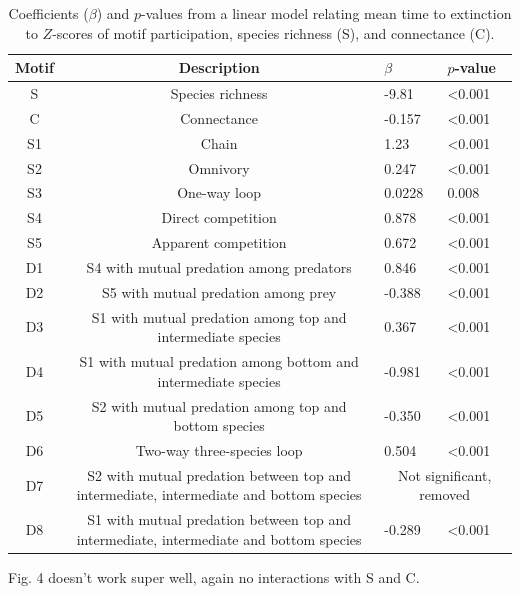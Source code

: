 \documentclass[12pt]{article}
\begin{document}
			\begin{table}
			\caption{Coefficients ($\beta$) and $p$-values from a linear model relating mean time to extinction to $Z$-scores of motif participation, species richness (S), and connectance (C). }
			\label{motif_lm}
			\begin{tabular}[h]{c | c | l l |}
			Motif & Description & $\beta$ & $p$-value \\
			\hline
			S & Species richness & -9.81 & \textless0.001 \\
			C & Connectance & -0.157 & \textless0.001 \\
			S1 & Chain & 1.23 & \textless0.001 \\
			S2 & Omnivory & 0.247 & \textless0.001 \\
			S3 & One-way loop & 0.0228 & 0.008 \\
			S4 & Direct competition & 0.878 & \textless0.001 \\
			S5 & Apparent competition & 0.672 & \textless0.001 \\
			D1 & S4 with mutual predation among predators & 0.846 & \textless0.001 \\
			D2 & S5 with mutual predation among prey & -0.388 & \textless0.001 \\
			D3 & S1 with mutual predation among top and intermediate species & 0.367 & \textless0.001 \\
			D4 & S1 with mutual predation among bottom and intermediate species & -0.981 & \textless0.001 \\
			D5 & S2 with mutual predation among top and bottom species & -0.350 & \textless0.001 \\
			D6 & Two-way three-species loop & 0.504 & \textless0.001 \\
			D7 & S2 with mutual predation between top and intermediate, intermediate and bottom species & \multicolumn{2}{c}{Not significant, removed} \\
			D8 & S1 with mutual predation between top and intermediate, intermediate and bottom species & -0.289 & \textless0.001 \\
			\hline
			\end{tabular}
			\end{table}



	Fig. 4 doesn't work super well, again no interactions with S and C.


\end{document}
